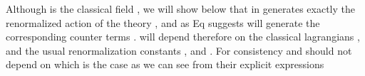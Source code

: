 \documentclass[a4paper,12pt]{article}
\begin{document}
Although \myHighlight{${\phi}$}\coordHE{} is the classical field , we will show below that \coordHE{} in \coordHE{} generates exactly the renormalized action of the \coordHE{} theory , and as Eq \coordHE{} suggests \coordHE{} will generate the corresponding counter terms . \myHighlight{${\chi}$}\coordHE{} will depend therefore on the classical lagrangians \coordHE{} ,
\coordHE{} and the usual renormalization constants \coordHE{}
, \coordHE{} and \coordHE{} . For consistency \coordHE{}
and \coordHE{} should not depend on \myHighlight{${\chi}$}\coordHE{} which is
the case as we can see from their explicit expressions
\end{document}
